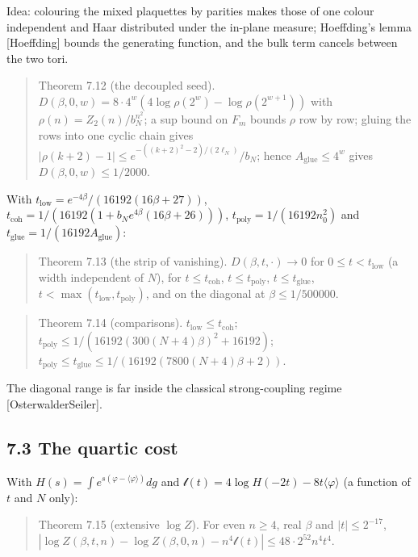 \documentclass[10pt,letterpaper,twocolumn]{article}
\begin{document}
Idea: colouring the mixed plaquettes by parities makes those of one colour independent and Haar distributed under the in-plane measure; Hoeffding's lemma {[}Hoeffding{]} bounds the generating function, and the bulk term cancels between the two tori.

\begin{quote}
Theorem 7.12 (the decoupled seed). \(D(\beta,0,w)=8\cdot4^w(4\log\rho(2^w)-\log\rho(2^{w+1}))\) with \(\rho(n)=Z_2(n)/b_N^{n^2}\); a sup bound on \(F_m\) bounds \(\rho\) row by row; gluing the rows into one cyclic chain gives \(|\rho(k+2)-1|\le e^{-((k+2)^2-2)/(2\ell_N)}/b_N\); hence \(A_{\mathrm{glue}}\le4^w\) gives \(D(\beta,0,w)\le1/2000\).
\end{quote}

With \(t_{\mathrm{low}}=e^{-4\beta}/(16192(16\beta+27))\), \(t_{\mathrm{coh}}=1/(16192(1+b_Ne^{4\beta}(16\beta+26)))\), \(t_{\mathrm{poly}}=1/(16192n_0^2)\) and \(t_{\mathrm{glue}}=1/(16192A_{\mathrm{glue}})\):

\begin{quote}
Theorem 7.13 (the strip of vanishing). \(D(\beta,t,\cdot)\to0\) for \(0\le t<t_{\mathrm{low}}\) (a width independent of \(N\)), for \(t\le t_{\mathrm{coh}}\), \(t\le t_{\mathrm{poly}}\), \(t\le t_{\mathrm{glue}}\), \(t<\max(t_{\mathrm{low}},t_{\mathrm{poly}})\), and on the diagonal at \(\beta\le1/500000\).
\end{quote}

\begin{quote}
Theorem 7.14 (comparisons). \(t_{\mathrm{low}}\le t_{\mathrm{coh}}\); \(t_{\mathrm{poly}}\le1/(16192(300(N+4)\beta)^2+16192)\); \(t_{\mathrm{poly}}\le t_{\mathrm{glue}}\le1/(16192(7800(N+4)\beta+2))\).
\end{quote}

The diagonal range is far inside the classical strong-coupling regime {[}OsterwalderSeiler{]}.

\subsection{7.3 The quartic cost}\label{73-the-quartic-cost}

With \(H(s)=\int e^{s(\varphi-\langle\varphi\rangle)}dg\) and \(\mathcal l(t)=4\log H(-2t)-8t\langle\varphi\rangle\) (a function of \(t\) and \(N\) only):

\begin{quote}
Theorem 7.15 (extensive \(\log Z\)). For even \(n\ge4\), real \(\beta\) and \(|t|\le2^{-17}\), \(|\log Z(\beta,t,n)-\log Z(\beta,0,n)-n^4\mathcal l(t)|\le48\cdot2^{52}n^4t^4\).
\end{quote}
\end{document}
